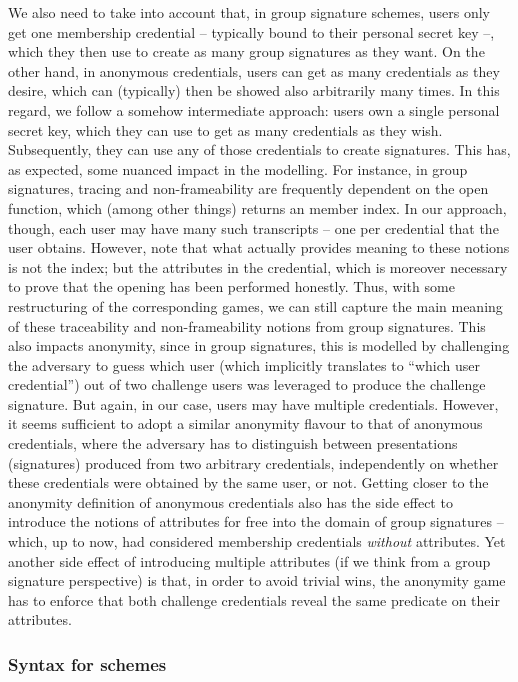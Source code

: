 We also need to take into account that, in group signature schemes, users only
get one membership credential -- typically bound to their personal secret
key --, which they then use to create as many group signatures as they want. On
the other hand, in anonymous credentials, users can get as many credentials as
they desire, which can (typically) then be showed also arbitrarily many times.
In this regard, we follow a somehow intermediate approach: users own a single
personal secret key, which they can use to get as many credentials as they wish.
Subsequently, they can use any of those credentials to create \GSAC signatures.
This has, as expected, some nuanced impact in the modelling. For instance, in
group signatures, tracing and non-frameability are frequently dependent on the
open function, which (among other things) returns an member index. In our
approach, though, each user may have many such transcripts -- one per credential
that the user obtains. However, note that what actually provides meaning to
these notions is not the index; but the attributes in the credential, which is
moreover necessary
to prove that the opening has been performed honestly. Thus, with some
restructuring of the corresponding games, we can still capture the main
meaning of these traceability and non-frameability notions from group
signatures. This also impacts anonymity, since in group signatures, this is
modelled by challenging the adversary to guess which user (which implicitly
translates to ``which user credential'') out of two challenge users was
leveraged to produce the challenge signature. But again, in our case, users may
have multiple credentials. However, it seems sufficient to adopt a similar
anonymity flavour to that of anonymous credentials, where the adversary has to
distinguish between presentations (signatures) produced from two arbitrary
credentials, independently on whether these credentials were obtained by the
same user, or not.
%
Getting closer to the anonymity definition of anonymous credentials also has the
side effect to introduce the notions of attributes for free into the domain of
group signatures -- which, up to now, had considered membership credentials
\emph{without} attributes. Yet another side effect of introducing multiple
attributes (if we think from a group signature perspective) is that, in order
to avoid trivial wins, the anonymity game has to enforce that both challenge
credentials reveal the same predicate on their attributes.

\subsubsection{Syntax for \GSAC schemes}
\label{sssec:syntax-gsac}

